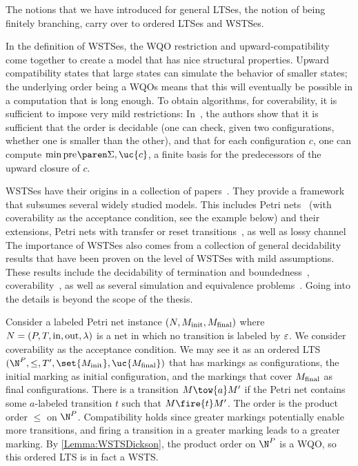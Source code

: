 \documentclass[../../diss.tex]{subfiles}
\begin{document}
The notions that we have introduced for general LTSes, \eg the notion of being finitely branching, carry over to ordered LTSes and WSTSes.

In the definition of WSTSes, the WQO restriction and upward-compatibility come together to create a model that has nice structural properties.
Upward compatibility states that large states can simulate the behavior of smaller states; the underlying order being a WQOs means that this will eventually be possible in a computation that is long enough.
To obtain algorithms, \eg for coverability, it is sufficient to impose very mild restrictions:
In~\cite{FinkelS01}, the authors show that it is sufficient that the order is decidable (\ie one can check, given two configurations, whether one is smaller than the other), and that for each configuration $c$, one can compute $\min \pre{}{\Sigma}{\uc{c}}$, a finite basis for the predecessors of the upward closure of $c$.

WSTSes have their origins in a collection of papers~\cite{Finkel87,Finkel90,AbdullaJ1993,AbdullaCJT96,FinkelS01}.
They provide a framework that subsumes several widely studied models.
This includes Petri nets~\cite{Esparza98} (with coverability as the acceptance condition, see the example below) and their extensions, \eg Petri nets with transfer or reset transitions~\cite{DufourdFS98}, as well as lossy channel 
The importance of WSTSes also comes from a collection of general decidability results that have been proven on the level of WSTSes with mild assumptions.
These results include the decidability of termination and boundedness~\cite{Finkel87,Finkel90}, coverability~\cite{AbdullaJ1993}, as well as several simulation and equivalence problems~\cite{FinkelS01}.
Going into the details is beyond the scope of the thesis.

\begin{example}
    Consider a labeled Petri net instance $(N,M_{\text{init}},M_{\text{final}})$ where $N = (P,T,\text{in},\text{out},\lambda)$ is a net in which no transition is labeled by $\varepsilon$.
    We consider coverability as the acceptance condition.
    We may see it as an ordered LTS $(\N^P,\leq,T',\set{\Minit},\uc{\Mfinal})$ that has markings as configurations, the initial marking as initial configuration, and the markings that cover $M_{\text{final}}$ as final configurations.
    There is a transition $M \tow{a} M'$ if the Petri net contains some $a$-labeled transition $t$ such that $M \fire{t} M'$.
    The order is the product order $\leq$ on $\N^P$.
    Compatibility holds since greater markings potentially enable more transitions, and firing a transition in a greater marking leads to a greater marking.
    By \cref{Lemma:WSTSDickson}, the product order on $\N^P$ is a WQO, so this ordered LTS is in fact a WSTS.\@
\end{example}
\end{document}
